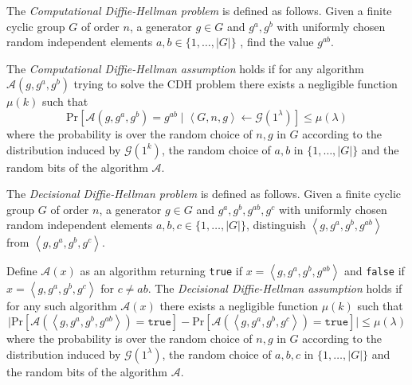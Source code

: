 \begin{defn}[CDH]
\label{def:cdh}
The \textit{Computational Diffie-Hellman problem} is defined as follows. Given a finite cyclic group $G$ of order $n$, a generator $g \in G$ and $g^a, g^b$ with uniformly chosen random independent elements $a, b \in \{ 1, \ldots, | G |\}$ , find the value $g^{ab}$.


The \textit{Computational Diffie-Hellman assumption} holds if for any algorithm $\mathcal{A} \left( g, g^a, g^b \right)$ trying to solve the CDH problem there exists a negligible function $\mu \left( k \right)$ such that 
 \begin{equation*}
  \textrm{Pr} \left[ \mathcal{A} \left( g, g^a, g^b \right) = g^{ab} \mid \left< G, n, g \right> \leftarrow \mathcal{G} \left( 1^{\lambda} \right)\right] \leq \mu \left( \lambda \right)
 \end{equation*}
 where the probability is over the random choice of $n, g$ in $G$ according to the distribution induced by $\mathcal{G} \left( 1^k \right)$, the random choice of $a, b$ in $\{ 1, \ldots, | G |\}$ and the random bits of the algorithm $\mathcal{A}$.
\end{defn}

\begin{defn}[DDH]
\label{def:ddh}
The \textit{Decisional Diffie-Hellman problem} is defined as follows. Given a finite cyclic group $G$ of order $n$, a generator $g \in G$ and $g^a, g^b, g^{ab}, g^c$ with uniformly chosen random independent elements $a, b, c \in \{ 1, \ldots, | G |\}$, distinguish $\left< g, g^a, g^b, g^{ab} \right>$ from $\left< g, g^a, g^b, g^c \right>$.

Define $\mathcal{A} \left( x \right)$ as an algorithm returning \texttt{true} if $x = \left< g, g^a, g^b, g^{ab} \right>$ and \texttt{false} if $x = \left< g, g^a, g^b, g^c \right>$ for $c \neq ab$. The \textit{Decisional Diffie-Hellman assumption} holds if for any such algorithm $\mathcal{A} \left( x \right)$ there exists a negligible function $\mu \left( k \right)$ such that 
 \begin{equation*}
  \lvert \textrm{Pr} \left[ \mathcal{A} \left( \left< g, g^a, g^b, g^{ab} \right> \right) = \texttt{true} \right] - \textrm{Pr} \left[ \mathcal{A} \left( \left< g, g^a, g^b, g^{c} \right> \right) = \texttt{true} \right] \rvert \leq \mu \left( \lambda \right)
 \end{equation*}
 where the probability is over the random choice of $n, g$ in $G$ according to the distribution induced by $\mathcal{G} \left( 1^{\lambda} \right)$, the random choice of $a, b, c$ in $\{ 1, \ldots, | G | \} $ and the random bits of the algorithm $\mathcal{A}$.
\end{defn}


